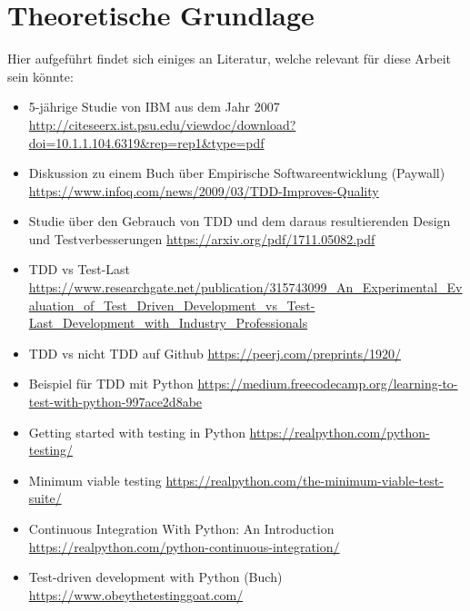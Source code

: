 \section{Theoretische Grundlage}
Hier aufgeführt findet sich einiges an Literatur, welche relevant für diese Arbeit
sein könnte:

\begin{itemize}
    \item 5-jährige Studie von IBM aus dem Jahr 2007
    \url{http://citeseerx.ist.psu.edu/viewdoc/download?doi=10.1.1.104.6319&rep=rep1&type=pdf}
    \item Diskussion zu einem Buch über Empirische Softwareentwicklung (Paywall)
    \url{https://www.infoq.com/news/2009/03/TDD-Improves-Quality}
    \item Studie über den Gebrauch von TDD und dem daraus resultierenden Design
    und Testverbesserungen
    \url{https://arxiv.org/pdf/1711.05082.pdf}
    \item TDD vs Test-Last
    \url{https://www.researchgate.net/publication/315743099_An_Experimental_Evaluation_of_Test_Driven_Development_vs_Test-Last_Development_with_Industry_Professionals}
    \item TDD vs nicht TDD auf Github
    \url{https://peerj.com/preprints/1920/}
    \item Beispiel für TDD mit Python
    \url{https://medium.freecodecamp.org/learning-to-test-with-python-997ace2d8abe}
    \item Getting started with testing in Python
    \url{https://realpython.com/python-testing/}
    \item Minimum viable testing
    \url{https://realpython.com/the-minimum-viable-test-suite/}
    \item Continuous Integration With Python: An Introduction
    \url{https://realpython.com/python-continuous-integration/}
    \item Test-driven development with Python (Buch)
    \url{https://www.obeythetestinggoat.com/}
\end{itemize}
